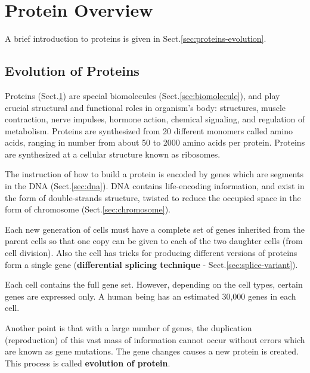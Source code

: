 \chapter{Protein Overview}
\label{sec:protein-overview}

A brief introduction to proteins is given in Sect.\ref{sec:proteins-evolution}.

\section{Evolution of Proteins}
\label{sec:evolution-proteins}
\label{sec:proteins-evolution}

Proteins (Sect.\ref{sec:protein-overview}) are special biomolecules
(Sect.\ref{sec:biomolecule}), and play crucial structural and functional roles
in organism's body: structures, muscle contraction, nerve impulses, hormone
action, chemical signaling, and regulation of metabolism.  Proteins are
synthesized from 20 different monomers called amino acids, ranging in number
from about 50 to 2000 amino acids per protein. Proteins are synthesized at a
cellular structure known as ribosomes.

The instruction of how to build a protein is encoded by genes which are segments
in the DNA (Sect.\ref{sec:dna}). DNA contains life-encoding information, and
exist in the form of double-strands structure, twisted to reduce the occupied
space in the form of chromosome (Sect.\ref{sec:chromosome}).

Each new generation of cells must have a complete set of genes inherited from
the parent cells so that one copy can be given to each of the two daughter cells
(from cell division). Also the cell has tricks for producing different versions
of proteins form a single gene ({\bf differential splicing technique} -
Sect.\ref{sec:splice-variant}). 

\begin{mdframed}
Each cell contains the full gene set. However, depending on the cell types,
certain genes are expressed only. A human being has an estimated 30,000 genes in
each cell.

\end{mdframed}


Another point is that with a large number of genes, the duplication
(reproduction) of this vast mass of information cannot occur without
errors which are known as gene mutations. The gene changes causes a
new protein is created. This process is called
{\bf evolution of protein}.

